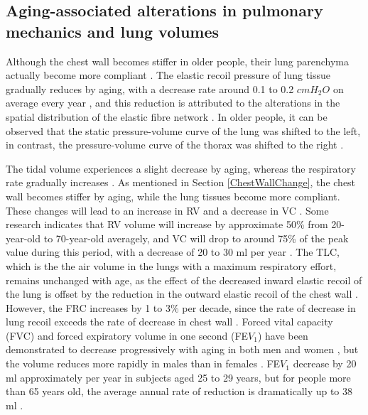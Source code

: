 \subsection{Aging-associated alterations in pulmonary mechanics and lung volumes}
Although the chest wall becomes stiffer in older people, their lung parenchyma actually become more compliant \citep{mittman1965relationship, turner1968elasticity, zaugg2000respiratory}. The elastic recoil pressure of lung tissue gradually reduces by aging, with a decrease rate around 0.1 to 0.2 $cmH_2O$ on average every year \citep{turner1968elasticity}, and this reduction is attributed to the alterations in the spatial distribution of the elastic fibre network \citep{sprung2006age}. In older people, it can be observed that the static pressure-volume curve of the lung was shifted to the left, in contrast, the pressure-volume curve of the thorax was shifted to the right \citep{zaugg2000respiratory,sprung2006age}.

The tidal volume experiences a slight decrease by aging, whereas the respiratory rate gradually increases \citep{sprung2006age}. As mentioned in Section \ref{ChestWallChange}, the chest wall becomes stiffer by aging, while the lung tissues become more compliant. These changes will lead to an increase in RV and a decrease in VC \citep{lalley2013aging}. Some research indicates that RV volume will increase by approximate 50\% from 20-year-old to 70-year-old averagely, and VC will drop to around 75\% of the peak value during this period, with a decrease of 20 to 30 ml per year \citep{janssens1999physiological, sprung2006age}. The TLC, which is the the air volume in the lungs with a maximum respiratory effort, remains unchanged with age, as the effect of the decreased inward elastic recoil of the lung is offset by the reduction in the outward elastic recoil of the chest wall \citep{sprung2006age}. However, the FRC increases by 1 to 3\% per decade, since the rate of decrease in lung recoil exceeds the rate of decrease in chest wall \citep{janssens1999physiological, lalley2013aging}. Forced vital capacity (FVC) and forced expiratory volume in one second (FE$V_1$) have been demonstrated to decrease progressively with aging in both men and women \citep{knudson1976maximal}, but the volume reduces more rapidly in males than in females \citep{crapo1993aging}. FE$V_1$ decrease by 20 ml approximately per year in subjects aged 25 to 29 years, but for people more than 65 years old, the average annual rate of reduction is dramatically up to 38 ml \citep{brandstetter1983aging}.

